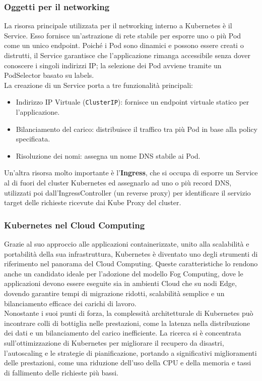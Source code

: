 \subsubsection{Oggetti per il networking}

La risorsa principale utilizzata per il networking interno a Kubernetes è il Service. Esso fornisce un'astrazione di rete stabile per esporre uno o più Pod come un unico endpoint. Poiché i Pod sono dinamici e possono essere creati o distrutti, il Service garantisce che l'applicazione rimanga accessibile senza dover conoscere i singoli indirizzi IP; la selezione dei Pod avviene tramite un PodSelector basato su labels.\\
La creazione di un Service porta a tre funzionalità principali:
\begin{itemize}
    \item Indirizzo IP Virtuale (\texttt{ClusterIP}): fornisce un endpoint virtuale statico per l'applicazione.
    \item Bilanciamento del carico: distribuisce il traffico tra più Pod in base alla policy specificata.
    \item Risoluzione dei nomi: assegna un nome DNS stabile ai Pod.
\end{itemize}

Un'altra risorsa molto importante è l'\textbf{Ingress}, che si occupa di esporre un Service al di fuori del cluster Kubernetes ed assegnarlo ad uno o più record DNS, utilizzati poi dall'IngressController (un reverse proxy) per identificare il servizio target delle richieste ricevute dai Kube Proxy del cluster.

\subsubsection{Kubernetes nel Cloud Computing}

Grazie al suo approccio alle applicazioni containerizzate, unito alla scalabilità e portabilità della sua infrastruttura, Kubernetes è diventato uno degli strumenti di riferimento nel panorama del Cloud Computing.
Queste caratteristiche lo rendono anche un candidato ideale per l'adozione del modello Fog Computing, dove le applicazioni devono essere eseguite sia in ambienti Cloud che su nodi Edge, dovendo garantire tempi di migrazione ridotti, scalabilità semplice e un bilanciamento efficace dei carichi di lavoro.\\
Nonostante i suoi punti di forza, la complessità architetturale di Kubernetes può incontrare colli di bottiglia nelle prestazioni, come la latenza nella distribuzione dei dati e un bilanciamento del carico inefficiente. La ricerca si è concentrata sull'ottimizzazione di Kubernetes per migliorare il recupero da disastri, l'autoscaling e le strategie di pianificazione, portando a significativi miglioramenti delle prestazioni, come una riduzione dell'uso della CPU e della memoria e tassi di fallimento delle richieste più bassi\cite{Mondal2024On}.



